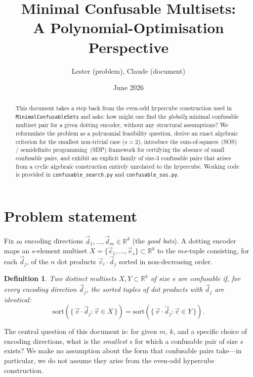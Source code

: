 \documentclass[12pt,a4paper]{article}
\title{Minimal Confusable Multisets:\\
A Polynomial-Optimisation Perspective}
\author{Lester (problem), Claude (document)}
\date{June 2026}
\newtheorem{definition}{Definition}
\begin{document}
\maketitle

\begin{abstract}
This document takes a step back from the even-odd hypercube construction
used in \texttt{MinimalConfusableSets} and asks: how might one find the
\emph{globally} minimal confusable multiset pair for a given dotting
encoder, without any structural assumptions?  We reformulate the problem
as a polynomial feasibility question, derive an exact algebraic criterion
for the smallest non-trivial case ($s = 2$), introduce the
sum-of-squares~(SOS) / semidefinite programming~(SDP) framework for
certifying the absence of small confusable pairs, and exhibit an explicit
family of size-3 confusable pairs that arises from a cyclic algebraic
construction entirely unrelated to the hypercube.  Working code is
provided in \texttt{confusable\_search.py} and \texttt{confusable\_sos.py}.
\end{abstract}

\tableofcontents
\newpage

\section{Problem statement}
\label{sec:problem}

Fix $m$ encoding directions $\vec{d}_1, \ldots, \vec{d}_m \in \mathbb{R}^k$
(the \emph{good bats}).  A dotting encoder maps an $s$-element multiset
$X = \{\vec{v}_1, \ldots, \vec{v}_s\} \subset \mathbb{R}^k$ to the
$ms$-tuple consisting, for each $\vec{d}_j$, of the $n$ dot products
$\vec{v}_i \cdot \vec{d}_j$ sorted in non-decreasing order.

\begin{definition}
  Two distinct multisets $X, Y \subset \mathbb{R}^k$ of size $s$ are
  \emph{confusable} if, for every encoding direction $\vec{d}_j$, the
  sorted tuples of dot products with $\vec{d}_j$ are identical:
  \[
    \text{sort}\!\left(\{\,\vec{v} \cdot \vec{d}_j : \vec{v} \in X\,\}\right)
    =
    \text{sort}\!\left(\{\,\vec{v} \cdot \vec{d}_j : \vec{v} \in Y\,\}\right).
  \]
\end{definition}

The central question of this document is: for given $m$, $k$, and a
specific choice of encoding directions, what is the \emph{smallest} $s$
for which a confusable pair of size $s$ exists?  We make no assumption
about the form that confusable pairs take---in particular, we do not
assume they arise from the even-odd hypercube construction.
\end{document}
